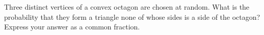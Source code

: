 Three distinct vertices of a convex octagon are chosen at random. What is the probability that they form a triangle none of whose sides is a side of the octagon? Express your answer as a common fraction.
